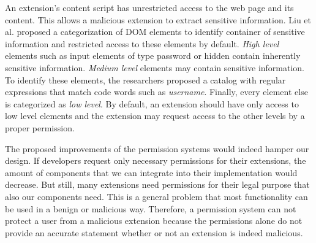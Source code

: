 	An extension's content script has unrestricted access to the web page and its content. This allows a malicious extension to extract sensitive information. Liu et al. proposed a categorization of DOM elements to identify container of sensitive information and restricted access to these elements by default. \textit{High level} elements such as input elements of type password or hidden contain inherently sensitive information. \textit{Medium level} elements may contain sensitive information. To identify these elements, the researchers proposed a catalog with regular expressions that match code words such as \textit{username}. Finally, every element else is categorized as \textit{low level}. By default, an extension should have only access to low level elements and the extension may request access to the other levels by a proper permission.
	
	The proposed improvements of the permission systems would indeed hamper our design. If developers request only necessary permissions for their extensions, the amount of components that we can integrate into their implementation would decrease. But still, many extensions need permissions for their legal purpose that also our components need. This is a general problem that most functionality can be used in a benign or malicious way. Therefore, a permission system can not protect a user from a malicious extension because the permissions alone do not provide an accurate statement whether or not an extension is indeed malicious. 